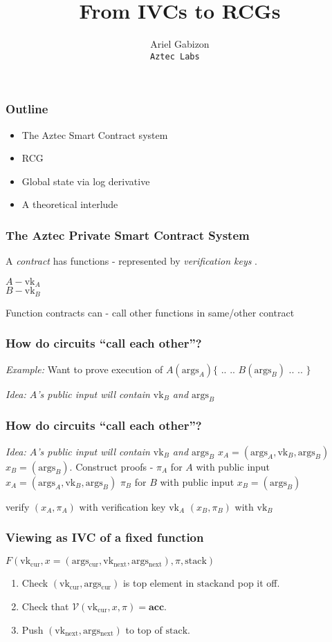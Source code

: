 \documentclass[shadesubsections,compress,14pt,mathserif]{beamer}
\title{\large{From IVCs to RCGs}}    %
\author{\small{Ariel Gabizon}\\                 %
\tt{\footnotesize{Aztec Labs}                                       } }      %
\date{}                    %
\newcommand{\ver}{\ensuremath{\mathcal{V}}}
\newcommand{\acc}{{\mathbf{acc}}}
\newcommand{\nl}{\\ \pause \vspace{0.2in}}
\newcommand{\vk}{\ensuremath{\mathrm{vk} }}
\newcommand{\vknext}{\ensuremath{\mathrm{vk_{next}} }}
\newcommand{\vkcur}{\ensuremath{\mathrm{vk_{cur}} }}
\newcommand{\args}{\ensuremath{\mathrm{args} }}
\newcommand{\stack}{\ensuremath{\mathrm{stack} }}
\newcommand{\argscur}{\ensuremath{\mathrm{args_{cur}} }}
\newcommand{\argsnext}{\ensuremath{\mathrm{args_{next}} }}
\begin{document}
\boldmath
\begin{frame}
  \titlepage
\end{frame}


\begin{frame}
 \frametitle{Outline}
 
 \begin{itemize}
  \item The Aztec Smart Contract system
  \item RCG
  \item Global state via log derivative
  \item A theoretical interlude
 \end{itemize}
\end{frame}
\begin{frame}
 \frametitle{The Aztec Private Smart Contract System}
A \emph{contract} has functions - represented by \emph{verification keys} .

$A - \vk_A$\nl
$B - \vk_B$

Function contracts can 
 - call other functions in same/other contract
 \end{frame}
 
\begin{frame}
\frametitle{How do circuits  ``call each other''?}
\emph{Example:} Want to prove execution of
$A(\args_A)\{$
..
..
$B(\args_B)$
..
..
$\}$

\textit{Idea: $A$'s public input will contain $\vk_B$ and $\args_B$}

\end{frame}
\begin{frame}
\frametitle{How do circuits  ``call each other''?}
\textit{Idea: $A$'s public input will contain $\vk_B$ and $\args_B$}
$x_A=(\args_A,\vk_B,\args_B)$
$x_B=(\args_B)$.
Construct proofs - 
  $\pi_A$ for $A$ with public input $x_A=(\args_A,\vk_B,\args_B)$
  $\pi_B$ for $B$ with public input $x_B=(\args_B)$
  
  verify $(x_A,\pi_A)$ with verification key $\vk_A$
            $(x_B,\pi_B)$ with $\vk_B$
\end{frame}
 
\begin{frame}
 \frametitle{Viewing as IVC of a fixed function}
 $F(\vkcur,x=(\argscur,\vknext,\argsnext),\pi,\stack)$
 \begin{enumerate}
  \item Check $(\vkcur,\argscur)$ is top element in \stack and pop it off.
  \item Check that $\ver(\vkcur,x,\pi)=\acc$.
  \item Push $(\vknext,\argsnext)$ to top of \stack.
 \end{enumerate}

\end{frame}
 
\end{document}
